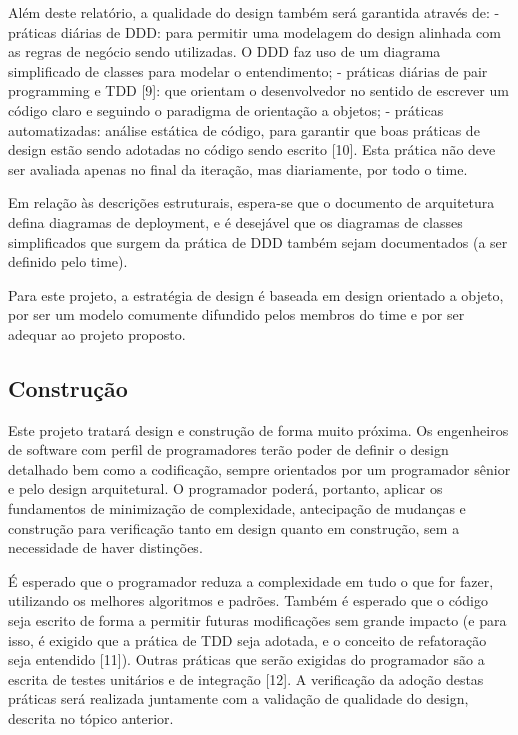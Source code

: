 \documentclass[12pt,journal,compsoc]{IEEEtran}
\begin{document}
Além deste relatório, a qualidade do design também será garantida através de:
- práticas diárias de DDD: para permitir uma modelagem do design alinhada com as regras de negócio sendo utilizadas. O DDD faz uso de um diagrama simplificado de classes para modelar o entendimento;
- práticas diárias de pair programming e TDD [9]: que orientam o desenvolvedor no sentido de escrever um código claro e seguindo o paradigma de orientação a objetos;
- práticas automatizadas: análise estática de código, para garantir que boas práticas de design estão sendo adotadas no código sendo escrito [10]. Esta prática não deve ser avaliada apenas no final da iteração, mas diariamente, por todo o time.

Em relação às descrições estruturais, espera-se que o documento de arquitetura defina diagramas de deployment, e é desejável que os diagramas de classes simplificados que surgem da prática de DDD também sejam documentados (a ser definido pelo time).

Para este projeto, a estratégia de design é baseada em design orientado a objeto, por ser um modelo comumente difundido pelos membros do time e por ser adequar ao projeto proposto.


\subsection{Construção}

Este projeto tratará design e construção de forma muito próxima. Os engenheiros de software com perfil de programadores terão poder de definir o design detalhado bem como a codificação, sempre orientados por um programador sênior e pelo design arquitetural. O programador poderá, portanto, aplicar os fundamentos de minimização de complexidade, antecipação de mudanças e construção para verificação tanto em design quanto em construção, sem a necessidade de haver distinções.

É esperado que o programador reduza a complexidade em tudo o que for fazer, utilizando os melhores algoritmos e padrões. Também é esperado que o código seja escrito de forma a permitir futuras modificações sem grande impacto (e para isso, é exigido que a prática de TDD seja adotada, e o conceito de refatoração seja entendido [11]). Outras práticas que serão exigidas do programador são a escrita de testes unitários e de integração [12]. A verificação da adoção destas práticas será realizada juntamente com a validação de qualidade do design, descrita no tópico anterior. 
\end{document}
